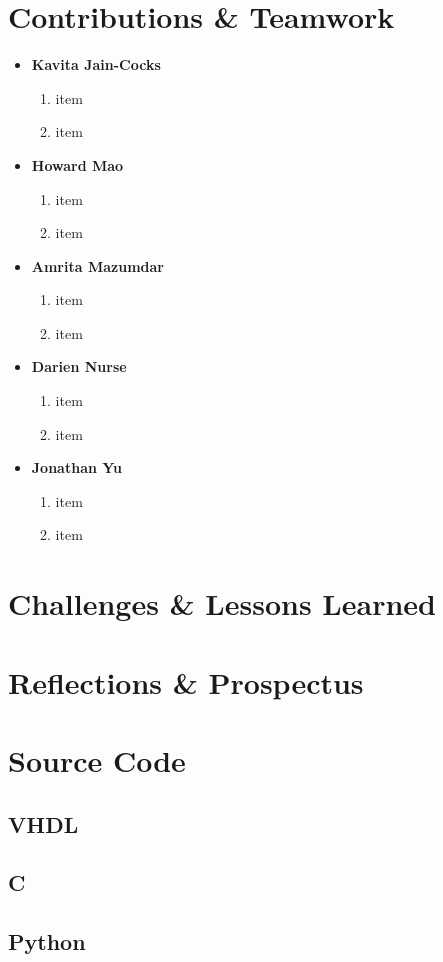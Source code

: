 \documentclass{article}
\begin{document}
\section{Contributions \& Teamwork}
	\begin{itemize}
	
	\item
	\textbf{Kavita Jain-Cocks}
		\begin{enumerate}
		\item item
		\item item
		\end{enumerate}
	
	\item 
	\textbf{Howard Mao}
		\begin{enumerate}
		\item item
		\item item
		\end{enumerate}
	
	\item 
	\textbf{Amrita Mazumdar}
		\begin{enumerate}
		\item item
		\item item
		\end{enumerate}
	
	\item 
	\textbf{Darien Nurse}
		\begin{enumerate}
		\item item
		\item item
		\end{enumerate}
	
	\item 
	\textbf{Jonathan Yu}
		\begin{enumerate}
		\item item
		\item item
		\end{enumerate}
	
	\end{itemize}

\section{Challenges \& Lessons Learned}

\section{Reflections \& Prospectus}
 
 \appendix
\section{Source Code}
 \subsection{VHDL}
 \subsection{C}
 \subsection{Python} %
 
\end{document}
